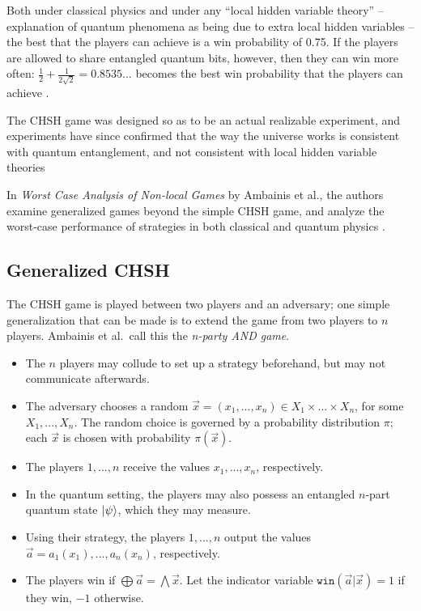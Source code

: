 Both under classical physics and under any ``local hidden variable theory'' -- explanation of quantum phenomena as being due to extra local hidden variables -- the best that the players can achieve is a win probability of 0.75. If the players are allowed to share entangled quantum bits, however, then they can win more often: $\frac12 + \frac1{2\sqrt2} = 0.8535$... becomes the best win probability that the players can achieve \cite{ABBSSV,CHSH}.

The CHSH game was designed so as to be an actual realizable experiment, and experiments have since confirmed that the way the universe works is consistent with quantum entanglement, and not consistent with local hidden variable theories \cite{aspect}

In \emph{Worst Case Analysis of Non-local Games} by Ambainis et al., the authors examine generalized games beyond the simple CHSH game, and analyze the worst-case performance of strategies in both classical and quantum physics \cite{ABBSSV}.

\subsection{Generalized CHSH}

The CHSH game is played between two players and an adversary; one simple generalization that can be made is to extend the game from two players to $n$ players. Ambainis et al.~call this the \emph{n-party AND game}.

\begin{itemize}
\item{The $n$ players may collude to set up a strategy beforehand, but may not communicate afterwards.}
\item{The adversary chooses a random $\vec{x}=(x_1, ..., x_n) \in X_1 \times ... \times X_n$, for some $X_1, ..., X_n$. The random choice is governed by a probability distribution $\pi$; each $\vec{x}$ is chosen with probability $\pi(\vec{x})$.}
\item{The players $1, ..., n$ receive the values $x_1, ..., x_n$, respectively.}
\item{In the quantum setting, the players may also possess an entangled $n$-part quantum state $\ket{\psi}$, which they may measure.}
\item{Using their strategy, the players $1, ..., n$ output the values $\vec{a} = a_1(x_1), ..., a_n(x_n)$, respectively.}
\item{The players win if $\bigoplus \vec{a} = \bigwedge \vec{x}$. Let the indicator variable $\texttt{win}(\vec{a}|\vec{x}) = 1$ if they win, $-1$ otherwise.}
\end{itemize}

